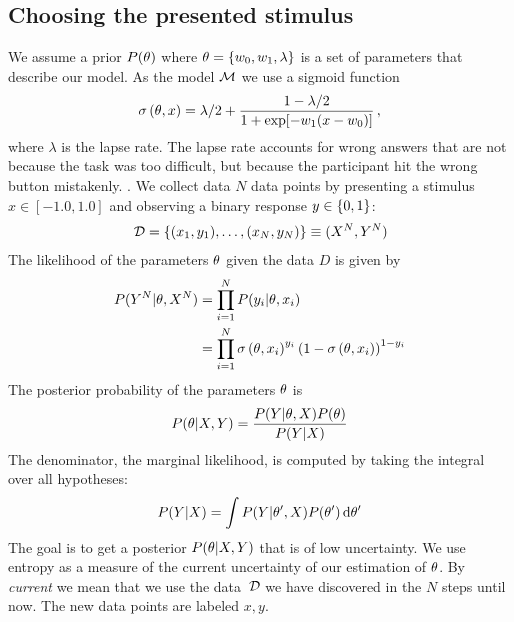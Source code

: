\subsection{Choosing the presented stimulus} %
\label{sub:choosing_the_presented_stimulus}
We assume a prior ${P(\theta)}$ where $\theta  = \left\{ w_0, w_1, \lambda \right\}$ is a set of parameters that describe our model.
As the model $\mathcal{M}$ we use a sigmoid function
\begin{align}
	{\sigma \left(\theta, x\right)} = \lambda / 2 + \frac{1-\lambda / 2}{1 + \exp[-w_1(x - w_0)]} \,,
\end{align}
where $\lambda$ is the lapse rate. The lapse rate accounts for wrong answers that are not because the task was too difficult, but because the participant hit the wrong button mistakenly.
.
We collect data $N$ data points by presenting a stimulus $x \in [-1.0, 1.0]$ and observing a binary response $y \in \left\{ 0, 1 \right\}$:
\begin{align}
	 \,\mathcal{D} = \left\{ (x_1, y_1), \dots, (x_N, y_N) \right\} \equiv (X^N, Y^N)
\end{align}
The likelihood of the parameters $\theta$ given the data $D$ is given by
\begin{align}
	{P(Y^N | \theta, X^N)}
	&= \prod_{i=1}^N {P(y_i | \theta, x_i)} \\
	&= \prod_{i=1}^N {\sigma \left(\theta, x_i\right)}^{y_i}
		\left( 1 - {\sigma \left(\theta, x_i\right)} \right)^{1-y_i}
\end{align}
The posterior probability of the parameters $\theta$ is
\begin{align}
	{P(\theta| X, Y)} = \frac{{P(Y | \theta, X)} {P(\theta)}}{{P(Y | X)}}
\end{align}
The denominator, \ie the marginal likelihood, is computed by taking the integral over all hypotheses:
\begin{align}
	{P(Y | X)} = \int {P(Y | \theta', X)} {P(\theta')} \,\mathrm{d} \theta'
\end{align}
The goal is to get a posterior ${P(\theta | X, Y)}$ that is of low uncertainty. We use entropy as a measure of the current uncertainty of our estimation of $\theta$. By \emph{current} we mean that we use the data $\,\mathcal{D}$ we have discovered in the $N$ steps until now. The new data points are labeled $x, y$.
